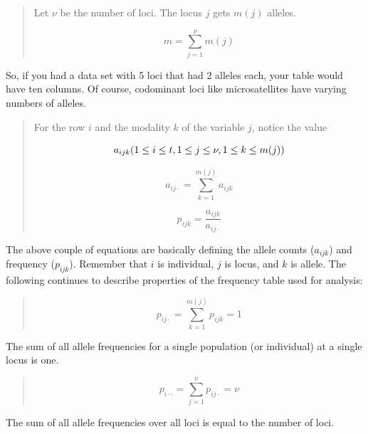 \documentclass[letterpaper]{article}\usepackage[]{graphicx}\usepackage[]{color}
\begin{document}
\begin{quote}
Let $\nu$ be the number of loci. The locus $j$ gets $m(j)$ alleles. 

\begin{equation}
  m=\sum_{j=1}^{\nu} m(j)
\end{equation}
\end{quote}

So, if you had a data set with 5 loci that had 2 alleles each, your table
would have ten columns. Of course, codominant loci like microsatellites have
varying numbers of alleles.


\begin{quote}
For the row $i$ and the modality $k$ of the variable $j$, notice the value

\begin{equation}
  a_{ijk}\\ (1 \leq i \leq t,\\ 1 \leq j \leq \nu,\\ 1 \leq k \leq m(j))
\end{equation}

\begin{equation}
  a_{ij\cdot}=\sum_{k=1}^{m(j)}a_{ijk} 
\end{equation}

\begin{equation}
  p_{ijk}=\frac{a_{ijk}}{a_{ij\cdot}}
\end{equation}
\end{quote}

The above couple of equations are basically defining the allele counts
($a_{ijk}$) and frequency ($p_{ijk}$). Remember that $i$ is individual, $j$ is
locus, and $k$ is allele. The following continues to describe properties of the
frequency table used for analysis:

\begin{quote}
\begin{equation}
 p_{ij\cdot}=\sum_{k=1}^{m(j)}p_{ijk}=1
\end{equation}
\end{quote}
The sum of all allele frequencies for a single population (or individual) at a 
single locus is one.

\begin{quote}
\begin{equation}
p_{i{\cdot}\cdot}=\sum_{j=1}^{\nu}p_{ij\cdot}=\nu
\end{equation}
\end{quote}
The sum of all allele frequencies over all loci is equal to the number of loci.
\end{document}
